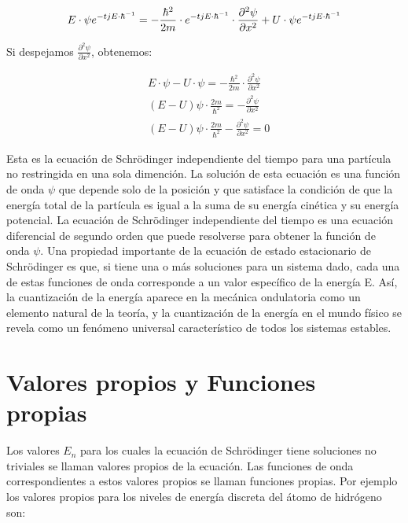 \documentclass[a4paper]{article}
\begin{document}
            \begin{equation}
            E \cdot \psi e^{-tjE \cdot \hbar^{-1}} = -\frac{\hbar^2}{2m} \cdot e^{-tjE \cdot \hbar^{-1}} \cdot \frac{\partial^2 \psi}{\partial x^2} + U \cdot \psi e^{-tjE \cdot \hbar^{-1}} \\
            \end{equation}

        \indent Si despejamos $\frac{\partial^2 \psi}{\partial x^2}$, obtenemos:

        \begin{align*}
            &E \cdot \psi - U \cdot \psi = -\frac{\hbar^2}{2m} \cdot \frac{\partial^2 \psi}{\partial x^2} \\
            &(E - U) \psi \cdot \frac{2m}{\hbar^2} = -\frac{\partial^2 \psi}{\partial x^2} \\
            &(E - U) \psi \cdot \frac{2m}{\hbar^2} - \frac{\partial^2 \psi}{\partial x^2} = 0
        \end{align*}

        \indent Esta es la ecuación de Schrödinger independiente del tiempo para una partícula no restringida en una sola dimención. La solución de esta ecuación es una función de onda $\psi$ que depende solo de la posición y que satisface la condición de que la energía total de la partícula es igual a la suma de su energía cinética y su energía potencial. La ecuación de Schrödinger independiente del tiempo es una ecuación diferencial de segundo orden que puede resolverse para obtener la función de onda $\psi$.
        \indent Una propiedad importante de la ecuación de estado estacionario de Schrödinger es que, si tiene una o más soluciones para un sistema dado, cada una de estas funciones de onda corresponde a un valor específico de la energía E. Así, la cuantización de la energía aparece en la mecánica ondulatoria como un elemento natural de la teoría, y la cuantización de la energía en el mundo físico se revela como un fenómeno universal característico de todos los sistemas estables.

    \newpage
    \noindent
    \thispagestyle{fancy}
        
    \section{Valores propios y Funciones propias}

    \indent Los valores $E_n$ para los cuales la ecuación de Schrödinger tiene soluciones no triviales se llaman valores propios de la ecuación. Las funciones de onda correspondientes a estos valores propios se llaman funciones propias. Por ejemplo los valores propios para los niveles de energía discreta del átomo de hidrógeno son:
\end{document}
